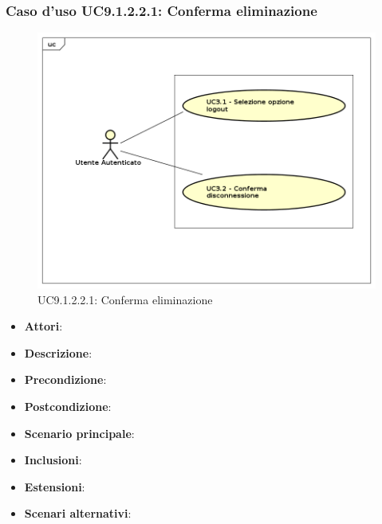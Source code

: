 				\subsubsection{Caso d'uso UC9.1.2.2.1: Conferma eliminazione}
				\label{UC9.1.2.2.1}
				\begin{figure}[h]
					\centering
				\includegraphics[scale=0.7,keepaspectratio]{UML/UC9.png}
					\caption{UC9.1.2.2.1: Conferma eliminazione}
				\end{figure}
				\FloatBarrier
				\begin{itemize}
					\item \textbf{Attori}: 
					\item \textbf{Descrizione}: 
					\item \textbf{Precondizione}: 
					\item \textbf{Postcondizione}: 
					\item \textbf{Scenario principale}:
					\item \textbf{Inclusioni}:
					\item \textbf{Estensioni}:
					\item \textbf{Scenari alternativi}:
				\end{itemize}
								
